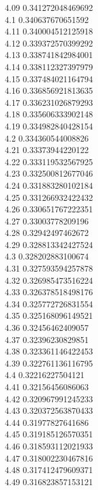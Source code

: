 {4.09	0.341272048469692\\
4.1	0.340637670651592\\
4.11	0.340004512125918\\
4.12	0.339372570399292\\
4.13	0.338741842984001\\
4.14	0.338112327397979\\
4.15	0.337484021164794\\
4.16	0.336856921813635\\
4.17	0.336231026879293\\
4.18	0.335606333902148\\
4.19	0.334982840428154\\
4.2	0.334360544008826\\
4.21	0.33373944220122\\
4.22	0.333119532567925\\
4.23	0.332500812677046\\
4.24	0.331883280102184\\
4.25	0.331266932422432\\
4.26	0.330651767222351\\
4.27	0.33003778209196\\
4.28	0.32942497462672\\
4.29	0.328813342427524\\
4.3	0.328202883100674\\
4.31	0.327593594257878\\
4.32	0.326985473516224\\
4.33	0.326378518498176\\
4.34	0.325772726831554\\
4.35	0.325168096149521\\
4.36	0.32456462409057\\
4.37	0.32396230829851\\
4.38	0.323361146422453\\
4.39	0.322761136116795\\
4.4	0.32216227504121\\
4.41	0.32156456086063\\
4.42	0.320967991245233\\
4.43	0.320372563870433\\
4.44	0.31977827641686\\
4.45	0.319185126570351\\
4.46	0.318593112021933\\
4.47	0.318002230467816\\
4.48	0.317412479609371\\
4.49	0.316823857153121\\
}
